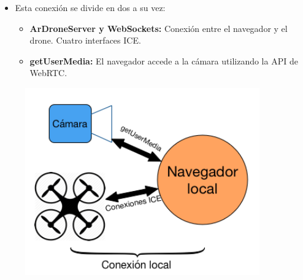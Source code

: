 \documentclass[notes,slidesec,a4]{seminar}
\begin{document}
\begin{hslide}
\begin{minipage}[t]{0.6\textwidth}
\begin{itemize}
\item Esta conexión se divide en dos a su vez:
\begin{itemize}
\item \textbf{ArDroneServer y WebSockets:} Conexión entre el navegador y el drone. Cuatro interfaces ICE.
\item \textbf{getUserMedia:} El navegador accede a la cámara utilizando la API de WebRTC.
\end{itemize}
\end{itemize}

\end{minipage}
\begin{minipage}[t]{0.6\textwidth}
\begin{center}
\begin{figure}
\includegraphics[width=0.9\textwidth]{img/conexionlocal}
\end{figure}
\end{center}
\end{minipage}
\end{hslide}


\end{document}
